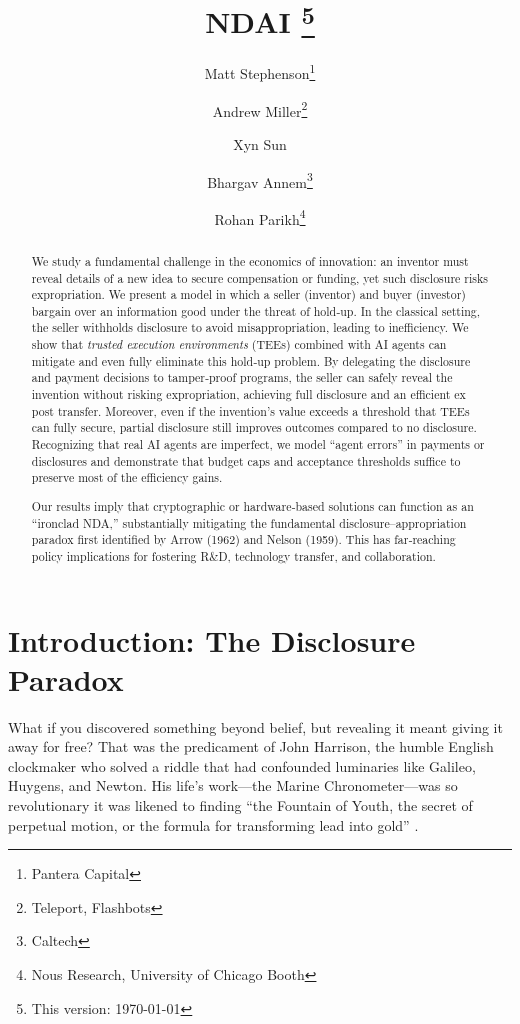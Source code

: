 \documentclass{article}
\title{NDAI \thanks{This version: \today}}
\author{
  Matt Stephenson\thanks{Pantera Capital}
  \and
  Andrew Miller\thanks{Teleport, Flashbots}
  \and
  Xyn Sun\footnotemark[2]
  \and
  Bhargav Annem\thanks{Caltech}
  \and
  Rohan Parikh\thanks{Nous Research, University of Chicago Booth}
}
\date{}
\begin{document}
\maketitle

\begin{abstract}
We study a fundamental challenge in the economics of innovation: an inventor must reveal details of a new idea to secure compensation or funding, yet such disclosure risks expropriation. We present a model in which a seller (inventor) and buyer (investor) bargain over an information good under the threat of hold‐up. In the classical setting, the seller withholds disclosure to avoid misappropriation, leading to inefficiency. We show that \emph{trusted execution environments} (TEEs) combined with AI agents can mitigate and even fully eliminate this hold‐up problem. By delegating the disclosure and payment decisions to tamper‐proof programs, the seller can safely reveal the invention without risking expropriation, achieving full disclosure and an efficient ex post transfer. Moreover, even if the invention’s value exceeds a threshold that TEEs can fully secure, partial disclosure still improves outcomes compared to no disclosure. Recognizing that real AI agents are imperfect, we model “agent errors” in payments or disclosures and demonstrate that budget caps and acceptance thresholds suffice to preserve most of the efficiency gains. 

Our results imply that cryptographic or hardware‐based solutions can function as an “ironclad NDA,” substantially mitigating the fundamental disclosure–appropriation paradox first identified by Arrow (1962) and Nelson (1959). This has far‐reaching policy implications for fostering R\&D, technology transfer, and collaboration.
\end{abstract}


\section{Introduction: The Disclosure Paradox}

What if you discovered something beyond belief, but revealing it meant giving it away for free? That was the predicament of John Harrison, the humble English clockmaker who solved a riddle that had confounded luminaries like Galileo, Huygens, and Newton. His life’s work—the Marine Chronometer—was so revolutionary it was likened to finding “the Fountain of Youth, the secret of perpetual motion, or the formula for transforming lead into gold” \citep{sobel2005longitude}.
\end{document}
